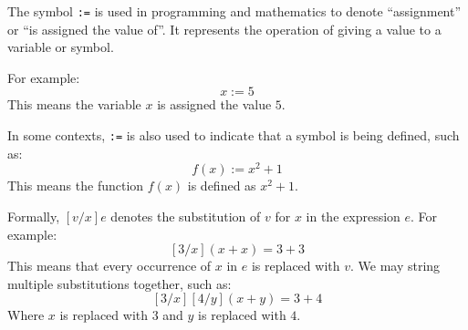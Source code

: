 \newpage







\begin{Def}[Symbol ``\texttt{:=}'']

    The symbol \texttt{:=} is used in programming and mathematics to denote ``assignment'' or ``is assigned the value of''. 
    It represents the operation of giving a value to a variable or symbol.

    \vspace{1em}
    \noindent
    For example:
    \[
    x := 5
    \]
    This means the variable $x$ is assigned the value $5$.

    \vspace{1em}
    \noindent
    In some contexts, \texttt{:=} is also used to indicate that a symbol is being defined, such as:
    \[
    f(x) := x^2 + 1
    \]
    This means the function $f(x)$ is defined as $x^2 + 1$.
\end{Def}

\begin{Def}
    
    \label{def:substitution}
    Formally, $[v/x]e$ denotes the substitution of $v$ for $x$ in the expression $e$.
    For example:
    \[
    [3/x](x + x) = 3 + 3
    \]
    This means that every occurrence of $x$ in $e$ is replaced with $v$. We may string multiple substitutions together,
    such as:
    \[
    [3/x][4/y](x + y) = 3 + 4
    \]
    Where $x$ is replaced with $3$ and $y$ is replaced with $4$.
\end{Def}

